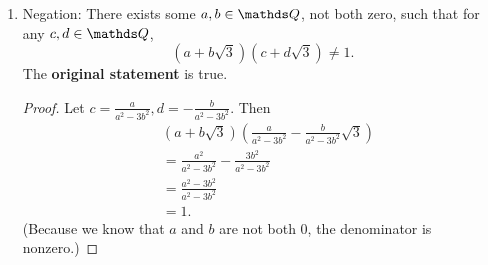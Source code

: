 \documentclass{review-sheet}
\begin{document}
\begin{solution}
\begin{enumerate}[label=(\alph*)]
    \item Negation: There exists some $a,b\in \Q$, not both zero, such that for any $c,d\in \Q$, \[
        \left( a+b\sqrt{3}  \right) \left( c+d\sqrt{3}  \right)  \neq 1
    .\] The \textbf{original statement} is true.
    \begin{proof}[Proof]
      Let $c=\frac{a}{a^2-3b^2}, d=-\frac{b}{a^2-3b^2}$. Then
      \begin{align*}
        &\left( a+b\sqrt{3}  \right) \left( \frac{a}{a^2-3b^2}-\frac{b}{a^2-3b^2}\sqrt{3}  \right)\\
        &= \frac{a^2}{a^2-3b^2} -\frac{3b^2}{a^2-3b^2}\\
        &=\frac{a^2-3b^2}{a^2-3b^2}\\
        &=1
      .\end{align*} (Because we know that  $a$ and $b$ are not both $0$, the denominator is nonzero.)
    \end{proof}
    
      
  \end{enumerate}
\end{solution}
\end{document}
